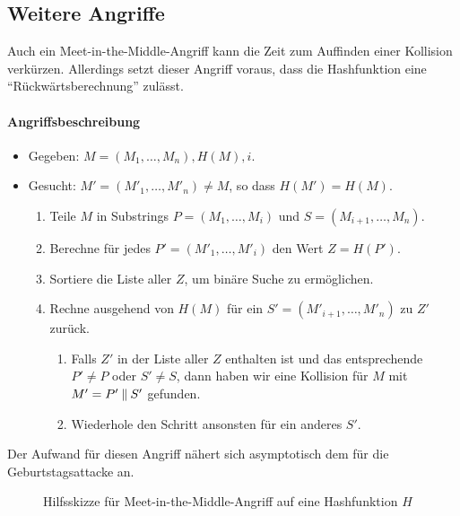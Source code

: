 \subsection{Weitere Angriffe}
Auch ein Meet-in-the-Middle-Angriff \indexMeetInTheMiddle kann die Zeit
zum Auffinden einer Kollision verkürzen. Allerdings setzt dieser Angriff
voraus, dass die Hashfunktion eine "`Rückwärtsberechnung"' zulässt.
\paragraph*{Angriffsbeschreibung}
\begin{itemize}
\item Gegeben: $M = (M_1,\dots,M_n), H(M), i$.
\item Gesucht: $M' = (M'_1,\dots,M'_n) \neq M$, so dass $H(M') = H(M)$.
  \begin{enumerate}
  \item Teile $M$ in Substrings $P = (M_1,\dots,M_i)$ und $S = (M_{i+1},\dots,M_{n})$.
  \item Berechne für jedes $P' = (M'_1,\dots,M'_i)$ den Wert $Z = H(P')$.
  \item Sortiere die Liste aller $Z$, um binäre Suche zu ermöglichen.
  \item Rechne ausgehend von $H(M)$ für ein $S' =
    (M'_{i+1},\dots,M'_{n})$ zu $Z'$ zurück. 
    \begin{enumerate}
    \item Falls $Z'$ in der Liste aller $Z$ enthalten ist und das
      entsprechende $P' \neq P$ oder $S' \neq S$, dann haben wir eine
      Kollision für $M$ mit $M' = P' \mathbin{\|} S'$ gefunden. 
    \item Wiederhole den Schritt ansonsten für ein anderes $S'$.
    \end{enumerate}
  \end{enumerate}
\end{itemize}
Der Aufwand für diesen Angriff nähert sich asymptotisch dem für die
Geburtstagsattacke an. 

\begin{figure}[h]
  \centering
  \caption{Hilfsskizze für Meet-in-the-Middle-Angriff auf eine Hashfunktion $H$}
  \label{fig:md-meet-in-the-middle-attack}
\end{figure}

